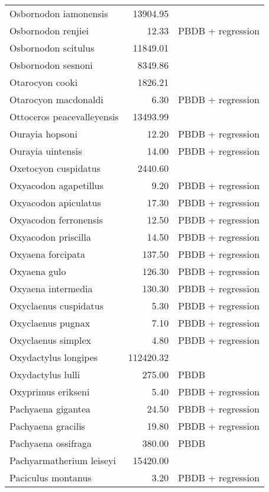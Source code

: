 \begin{table}[ht]
\begin{tabular}{lrl}
  Osbornodon iamonensis & 13904.95 & \cite{Tomiya2013} \\ 
  Osbornodon renjiei & 12.33 & PBDB + regression \\ 
  Osbornodon scitulus & 11849.01 & \cite{Tomiya2013} \\ 
  Osbornodon sesnoni & 8349.86 & \cite{Tomiya2013} \\ 
  Otarocyon cooki & 1826.21 & \cite{Tomiya2013} \\ 
  Otarocyon macdonaldi & 6.30 & PBDB + regression \\ 
  Ottoceros peacevalleyensis & 13493.99 & \cite{Tomiya2013} \\ 
  Ourayia hopsoni & 12.20 & PBDB + regression \\ 
  Ourayia uintensis & 14.00 & PBDB + regression \\ 
  Oxetocyon cuspidatus & 2440.60 & \cite{Tomiya2013} \\ 
  Oxyacodon agapetillus & 9.20 & PBDB + regression \\ 
  Oxyacodon apiculatus & 17.30 & PBDB + regression \\ 
  Oxyacodon ferronensis & 12.50 & PBDB + regression \\ 
  Oxyacodon priscilla & 14.50 & PBDB + regression \\ 
  Oxyaena forcipata & 137.50 & PBDB + regression \\ 
  Oxyaena gulo & 126.30 & PBDB + regression \\ 
  Oxyaena intermedia & 130.30 & PBDB + regression \\ 
  Oxyclaenus cuspidatus & 5.30 & PBDB + regression \\ 
  Oxyclaenus pugnax & 7.10 & PBDB + regression \\ 
  Oxyclaenus simplex & 4.80 & PBDB + regression \\ 
  Oxydactylus longipes & 112420.32 & \cite{Tomiya2013} \\ 
  Oxydactylus lulli & 275.00 & PBDB \\ 
  Oxyprimus erikseni & 5.40 & PBDB + regression \\ 
  Pachyaena gigantea & 24.50 & PBDB + regression \\ 
  Pachyaena gracilis & 19.80 & PBDB + regression \\ 
  Pachyaena ossifraga & 380.00 & PBDB \\ 
  Pachyarmatherium leiseyi & 15420.00 & \cite{McDonald1995} \\ 
  Paciculus montanus & 3.20 & PBDB + regression \\ 

\end{tabular}
\end{table}
